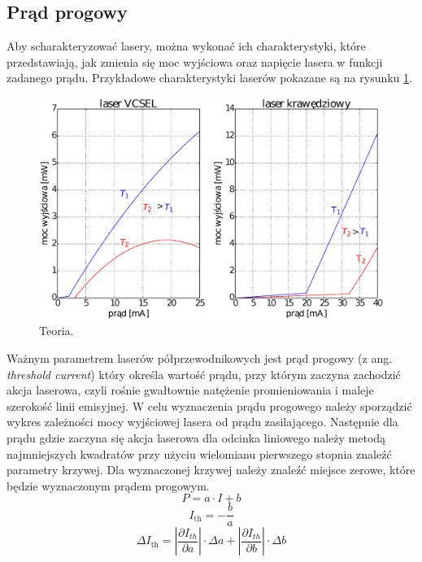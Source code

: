 \subsection{Prąd progowy}
Aby scharakteryzować lasery, można wykonać ich charakterystyki, które przedstawiają, jak zmienia się moc wyjściowa oraz napięcie lasera w funkcji zadanego prądu.
Przykładowe charakterystyki laserów pokazane są na rysunku \ref{teoria_rys_1}.
\begin{figure}
\center
  \includegraphics[scale=0.30]{wykres2.eps}
  \caption{Teoria.}
  \label{teoria_rys_1}
\end{figure}
Ważnym parametrem laserów półprzewodnikowych jest prąd progowy (z ang. \textit{threshold
current}) który określa wartość prądu, przy którym zaczyna zachodzić akcja laserowa, czyli
rośnie gwałtownie natężenie promieniowania i maleje szerokość linii emisyjnej. W celu wyznaczenia prądu progowego należy sporządzić wykres zależności mocy wyjściowej lasera od prądu zasilającego. Następnie dla prądu gdzie zaczyna się akcja laserowa dla odcinka liniowego należy metodą najmniejszych kwadratów przy użyciu wielomianu pierwszego stopnia znaleźć parametry krzywej. Dla wyznaczonej krzywej należy znaleźć miejsce zerowe, które będzie wyznaczonym prądem progowym.
\begin{equation}
P = a \cdot I + b
\end{equation}
\begin{equation}
I_{\mathrm{th}} = -\frac{b}{a}
\end{equation}
\begin{equation}
\Delta I_{\mathrm{th}} = \left\lvert \frac{\partial I_{th}}{\partial a} \right\rvert \cdot \Delta a + \left\lvert \frac{\partial I_{th}}{\partial b} \right\rvert \cdot \Delta b
\end{equation}
